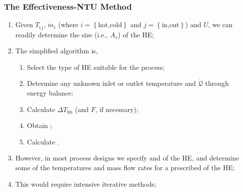 \documentclass[10pt,compress,unknownkeysallowed]{beamer}
\begin{document}
\begin{frame}
  \frametitle{The Effectiveness-NTU Method}
     \begin{enumerate}%
          \item<1-> Given $T_{\text{i,j}}$, $\dot{m}_{i}$ (where $i = \left\{\text{hot,cold}\right\}$ and $j = \left\{\text{in,out}\right\}$) and $U$, we can readily determine the size (i.e., $A_{s}$) of the HE;
          \item<1-> The simplified algorithm is,
             \begin{enumerate}
                 \item<2-> Select the type of HE suitable for the process;
                 \item<2-> Determine any unknown inlet or outlet temperature and $\dot{\mathcal{Q}}$ through energy balance;
                 \item<2-> Calculate $\Delta T_{\text{lm}}$ (and $F$, if necessary);
                 \item<2-> Obtain ;
                 \item<2-> Calculate . 
             \end{enumerate}
          \item<4-> However, in most process designs we specify  and  of the HE, and determine some of the temperatures and mass flow rates for a prescribed  of the HE;
          \item<5-> This would require intensive iterative methods;
     \end{enumerate}

\end{frame}
\end{document}
